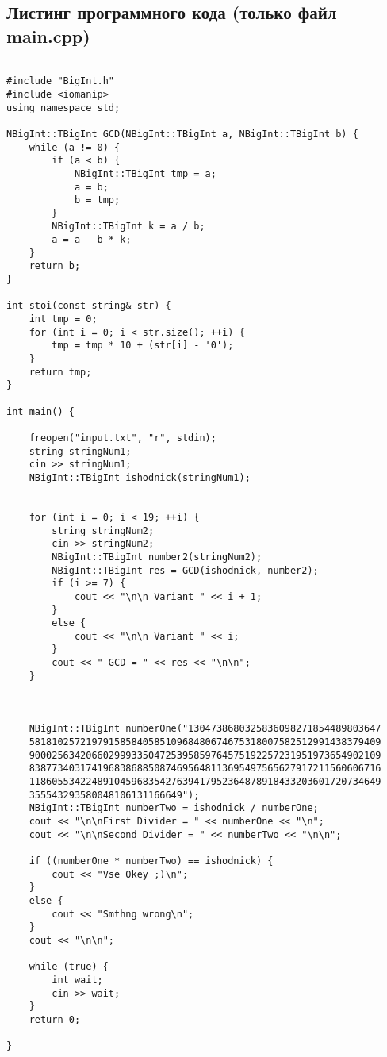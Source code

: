 \documentclass[12pt]{article}
\begin{document}
\subsection*{Листинг программного кода (только файл main.cpp)}
\begin{lstlisting}

#include "BigInt.h"
#include <iomanip>
using namespace std;

NBigInt::TBigInt GCD(NBigInt::TBigInt a, NBigInt::TBigInt b) {
	while (a != 0) {
		if (a < b) {
			NBigInt::TBigInt tmp = a;
			a = b;
			b = tmp;
		}
		NBigInt::TBigInt k = a / b;
		a = a - b * k;
	}
	return b;
}

int stoi(const string& str) {
	int tmp = 0;
	for (int i = 0; i < str.size(); ++i) {
		tmp = tmp * 10 + (str[i] - '0');
	}
	return tmp;
}

int main() {

	freopen("input.txt", "r", stdin);
	string stringNum1;
	cin >> stringNum1;
	NBigInt::TBigInt ishodnick(stringNum1);


	for (int i = 0; i < 19; ++i) {
		string stringNum2;
		cin >> stringNum2;
		NBigInt::TBigInt number2(stringNum2);
		NBigInt::TBigInt res = GCD(ishodnick, number2);
		if (i >= 7) {
			cout << "\n\n Variant " << i + 1;
		}
		else {
			cout << "\n\n Variant " << i;
		}
		cout << " GCD = " << res << "\n\n";
	}


	
	NBigInt::TBigInt numberOne("1304738680325836098271854489803647
	58181025721979158584058510968480674675318007582512991438379409
	90002563420660299933504725395859764575192257231951973654902109
	83877340317419683868850874695648113695497565627917211560606716
	11860553422489104596835427639417952364878918433203601720734649
	355543293580048106131166649");
	NBigInt::TBigInt numberTwo = ishodnick / numberOne;
	cout << "\n\nFirst Divider = " << numberOne << "\n";
	cout << "\n\nSecond Divider = " << numberTwo << "\n\n";
	
	if ((numberOne * numberTwo) == ishodnick) {
		cout << "Vse Okey ;)\n";
	}
	else {
		cout << "Smthng wrong\n";
	}
	cout << "\n\n";

	while (true) { 
		int wait;
		cin >> wait;
	}
	return 0;

}


\end{lstlisting}

\newpage
\end{document}
